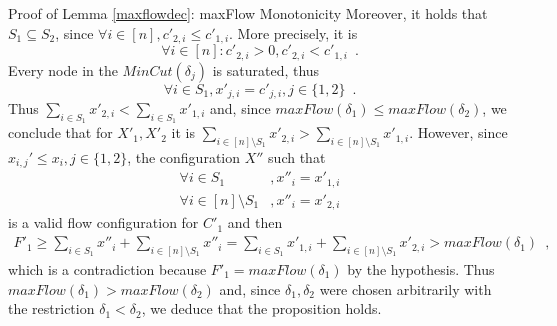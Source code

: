 \begin{sepproof}{Proof of Lemma \ref{maxflowdec}: maxFlow Monotonicity}
%
  Moreover, it holds that $S_1 \subseteq S_2$, since $\forall i \in [n], c'_{2, i} \leq c'_{1, i}$. More precisely, it is
  \begin{equation*}
    \forall i \in [n] : c'_{2, i} > 0, c'_{2, i} < c'_{1, i} \enspace.
  \end{equation*}
  Every node in the $MinCut\left(\delta_j\right)$ is saturated, thus
  \begin{equation*}
    \forall i \in S_1, x'_{j, i} = c'_{j, i}, j \in \{1, 2\} \enspace.
  \end{equation*}
  Thus $\sum\limits_{i \in S_1} x'_{2, i} < \sum\limits_{i \in S_1}x'_{1, i}$ and, since $maxFlow(\delta_1) \leq
  maxFlow(\delta_2)$, we conclude that for $X'_1, X'_2$ it is $\sum\limits_{i \in [n] \setminus S_1}x'_{2, i} >
  \sum\limits_{i \in [n] \setminus S_1}x'_{1, i}$. However, since $x_{i,j}' \leq x_i, j \in \{1,2\}$, the configuration $X''$
  such that
  \begin{align*}
    \forall i \in S_1&, x''_i = x'_{1, i} \\
    \forall i \in [n] \setminus S_1&, x''_i = x'_{2, i}
  \end{align*}
  is a valid flow configuration for $C'_1$ and then
  \begin{equation*}
  \begin{gathered}
    F'_1 \geq \sum\limits_{i \in S_1}x''_i + \sum\limits_{i \in [n] \setminus S_1}x''_i = \sum\limits_{i \in S_1}x'_{1, i} +
    \sum\limits_{i \in [n] \setminus S_1}x'_{2, i} > maxFlow\left(\delta_1\right)
    \enspace,
  \end{gathered}
  \end{equation*}
  which is a contradiction because $F'_1 = maxFlow\left(\delta_1\right)$ by the hypothesis. Thus
  $maxFlow\left(\delta_1\right) > maxFlow\left(\delta_2\right)$ and, since $\delta_1, \delta_2$ were chosen arbitrarily with
  the restriction $\delta_1 < \delta_2$, we deduce that the proposition holds.
\end{sepproof}
